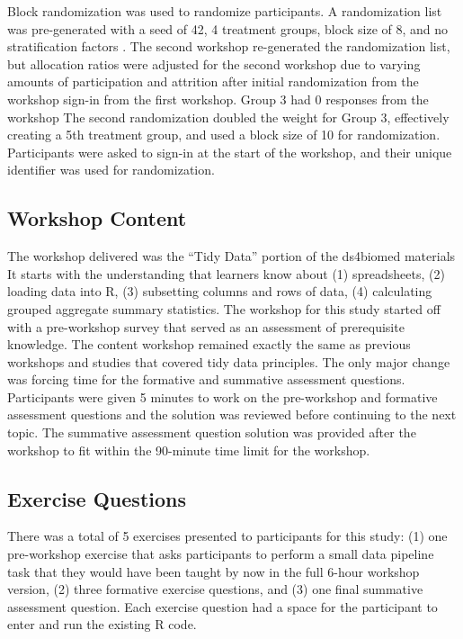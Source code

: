 \documentclass[040-assessment.tex]{subfiles}
\begin{document}
    Block randomization was used to randomize participants.
    A randomization list was pre-generated with a
    seed of 42, 4 treatment groups, block size of 8, and no stratification factors
    \cite{sealedenvelopeltdCreateBlockedRandomisation2021}.
    The second workshop re-generated the randomization list,
    but allocation ratios were adjusted for the second workshop due to varying amounts of participation
    and attrition after initial randomization from the workshop sign-in from the first workshop.
    Group 3 had 0 responses from the workshop
    The second randomization doubled the weight for Group 3,
    effectively creating a 5th treatment group, and used a block size of 10 for randomization.
    Participants were asked to sign-in at the start of the workshop,
    and their unique identifier was used for randomization.

\subsection{Workshop Content}

    The workshop delivered was  the ``Tidy Data'' portion of the ds4biomed materials %
    It starts with the understanding that learners know about
    (1) spreadsheets,
    (2) loading data into R,
    (3) subsetting columns and rows of data,
    (4) calculating grouped aggregate summary statistics.
    The workshop for this study started off with a pre-workshop survey that served as an assessment of
    prerequisite knowledge.
    The content workshop remained exactly the same as previous workshops and studies
    that covered tidy data principles.
    The only major change was forcing time for the formative and summative assessment questions.
    Participants were given 5 minutes to work on the pre-workshop and formative assessment questions
    and the solution was reviewed before continuing to the next topic.
    The summative assessment question solution was provided after the workshop to fit within the
    90-minute time limit for the workshop.

\subsection{Exercise Questions}

There was a total of 5 exercises presented to participants for this study:
(1) one pre-workshop exercise that asks participants to perform a small data pipeline task that they would
    have been taught by now in the full 6-hour workshop version,
(2) three formative exercise questions, and
(3) one final summative assessment question.
Each exercise question had a space for the participant to enter and run the existing R code.
\end{document}
